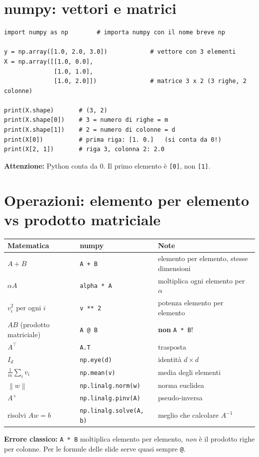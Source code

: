 \documentclass[11pt,a4paper]{article}
\newcommand{\norm}[1]{\left\lVert #1 \right\rVert}
\begin{document}
\section{numpy: vettori e matrici}
\begin{lstlisting}
import numpy as np        # importa numpy con il nome breve np

y = np.array([1.0, 2.0, 3.0])            # vettore con 3 elementi
X = np.array([[1.0, 0.0],
              [1.0, 1.0],
              [1.0, 2.0]])               # matrice 3 x 2 (3 righe, 2 colonne)

print(X.shape)       # (3, 2)
print(X.shape[0])    # 3 = numero di righe = m
print(X.shape[1])    # 2 = numero di colonne = d
print(X[0])          # prima riga: [1. 0.]   (si conta da 0!)
print(X[2, 1])       # riga 3, colonna 2: 2.0
\end{lstlisting}
\textbf{Attenzione:} Python conta da $0$. Il primo elemento è \texttt{[0]}, non \texttt{[1]}.

\section{Operazioni: elemento per elemento vs prodotto matriciale}
\begin{center}
\begin{tabular}{@{}lll@{}}
\toprule
Matematica & numpy & Note \\
\midrule
$A + B$ & \texttt{A + B} & elemento per elemento, stesse dimensioni \\
$\alpha A$ & \texttt{alpha * A} & moltiplica ogni elemento per $\alpha$ \\
$v_i^2$ per ogni $i$ & \texttt{v ** 2} & potenza elemento per elemento \\
$AB$ (prodotto matriciale) & \texttt{A @ B} & \textbf{non} \texttt{A * B}! \\
$A^\top$ & \texttt{A.T} & trasposta \\
$I_d$ & \texttt{np.eye(d)} & identità $d\times d$ \\
$\frac{1}{m}\sum_i v_i$ & \texttt{np.mean(v)} & media degli elementi \\
$\norm{w}$ & \texttt{np.linalg.norm(w)} & norma euclidea \\
$A^{+}$ & \texttt{np.linalg.pinv(A)} & pseudo-inversa \\
risolvi $Aw = b$ & \texttt{np.linalg.solve(A, b)} & meglio che calcolare $A^{-1}$ \\
\bottomrule
\end{tabular}
\end{center}
\textbf{Errore classico:} \texttt{A * B} moltiplica elemento per elemento, \emph{non} è il prodotto righe per colonne.
Per le formule delle slide serve quasi sempre \texttt{@}.
\end{document}

